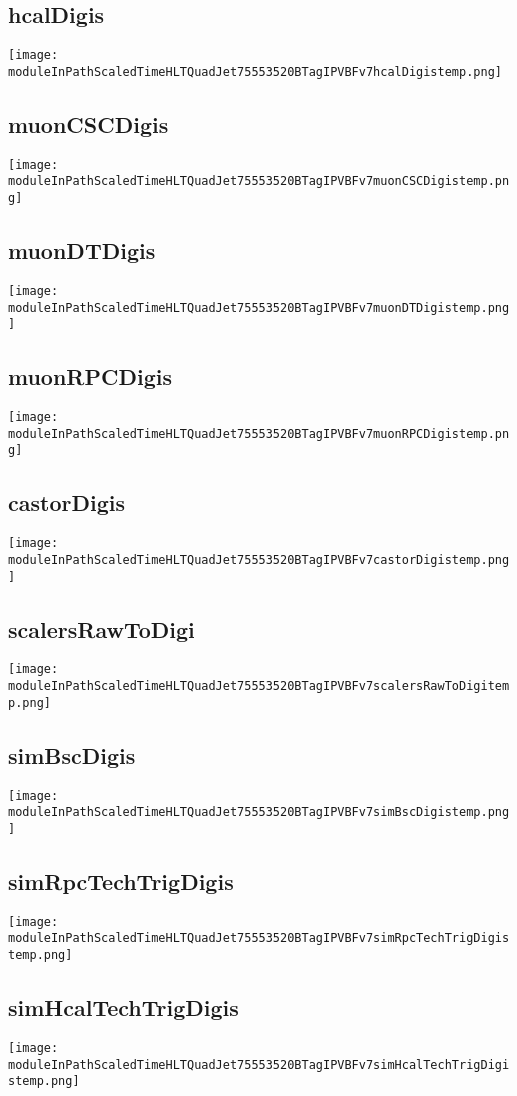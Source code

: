 \documentclass[10pt,a5paper,landscape]{report}
\begin{document}
\subsection{hcalDigis} \centering \texttt{[image: moduleInPathScaledTimeHLTQuadJet75553520BTagIPVBFv7hcalDigistemp.png]}
\subsection{muonCSCDigis} \centering \texttt{[image: moduleInPathScaledTimeHLTQuadJet75553520BTagIPVBFv7muonCSCDigistemp.png]}
\subsection{muonDTDigis} \centering \texttt{[image: moduleInPathScaledTimeHLTQuadJet75553520BTagIPVBFv7muonDTDigistemp.png]}
\subsection{muonRPCDigis} \centering \texttt{[image: moduleInPathScaledTimeHLTQuadJet75553520BTagIPVBFv7muonRPCDigistemp.png]}
\subsection{castorDigis} \centering \texttt{[image: moduleInPathScaledTimeHLTQuadJet75553520BTagIPVBFv7castorDigistemp.png]}
\subsection{scalersRawToDigi} \centering \texttt{[image: moduleInPathScaledTimeHLTQuadJet75553520BTagIPVBFv7scalersRawToDigitemp.png]}
\subsection{simBscDigis} \centering \texttt{[image: moduleInPathScaledTimeHLTQuadJet75553520BTagIPVBFv7simBscDigistemp.png]}
\subsection{simRpcTechTrigDigis} \centering \texttt{[image: moduleInPathScaledTimeHLTQuadJet75553520BTagIPVBFv7simRpcTechTrigDigistemp.png]}
\subsection{simHcalTechTrigDigis} \centering \texttt{[image: moduleInPathScaledTimeHLTQuadJet75553520BTagIPVBFv7simHcalTechTrigDigistemp.png]}
\end{document}
